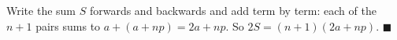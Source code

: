 Write the sum $S$ forwards and backwards and add term by term: each of the $n+1$ pairs sums to $a+(a+np)=2a+np$. So $2S=(n+1)(2a+np)$. $\blacksquare$
